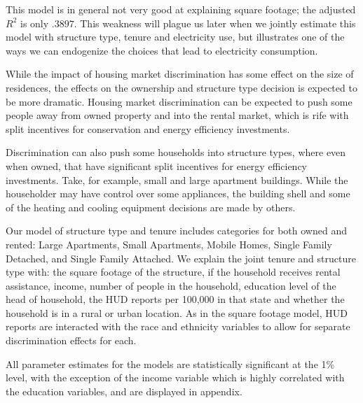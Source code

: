 \documentclass{article}
\begin{document}
This model is in general not very good at explaining square footage; the adjusted $R^2$ is only $.3897$.  This weakness will plague us later when we jointly estimate this model with structure type, tenure and electricity use, but illustrates one of the ways we can endogenize the choices that lead to electricity consumption.





While the impact of housing market discrimination has some effect on the size of residences, the effects on the ownership and structure type decision is expected to be more dramatic.  Housing market discrimination can be expected to push some people away from owned property and into the rental market, which is rife with split incentives for conservation and energy efficiency investments.  

Discrimination can also push some households into structure types, where even when owned, that have significant split incentives for energy efficiency investments.  Take, for example, small and large apartment buildings.  While the householder may have control over some appliances, the building shell and some of the heating and cooling equipment decisions are made by others.  

Our model of structure type and tenure includes categories for both owned and rented: Large Apartments, Small Apartments, Mobile Homes, Single Family Detached, and Single Family Attached.  We explain the joint tenure and structure type with: the square footage of the structure, if the household receives rental assistance, income, number of people in the household, education level of the head of household, the HUD reports per 100,000 in that state and whether the household is in a rural or urban location.  As in the square footage model, HUD reports are interacted with the race and ethnicity variables to allow for separate discrimination effects for each.


All parameter estimates for the models are statistically significant at the 1\% level, with the exception of the income variable which is highly correlated with the education variables, and are displayed in appendix. 
\end{document}
